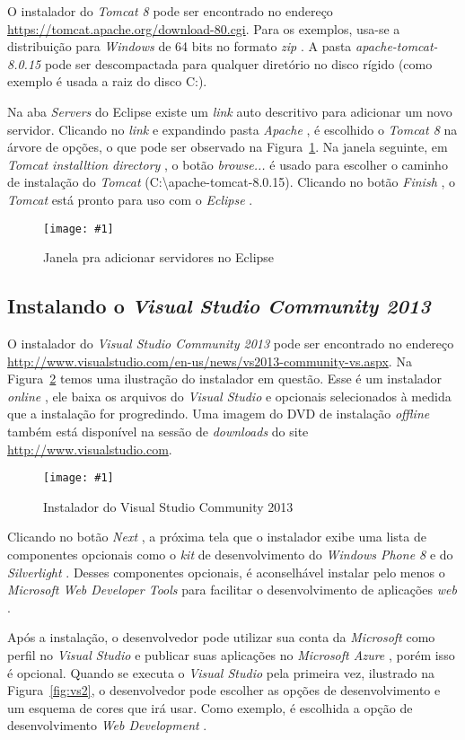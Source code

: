 \documentclass[a4paper,12pt]{article}
\newcommand{\figura}[3] {
	\begin{figure}[ht]
		\centering
		\texttt{[image: \#1]}
		\caption{#2}
		\label{#3}
	\end{figure}
	\FloatBarrier
}
\newcommand{\est}[1] {
	\textit{#1}
}
\begin{document}
O instalador do \est{Tomcat 8} pode ser encontrado no endereço \url{https://tomcat.apache.org/download-80.cgi}. Para os exemplos, usa-se a distribuição para \est{Windows} de 64 bits no formato \est{zip}. A pasta \est{apache-tomcat-8.0.15} pode ser descompactada para qualquer diretório no disco rígido (como exemplo é usada a raiz do disco C:).  

Na aba \est{Servers} do Eclipse existe um \est{link} auto descritivo para adicionar um novo servidor. Clicando no \est{link} e expandindo pasta \est{Apache}, é escolhido o \est{Tomcat 8} na árvore de opções, o que pode ser observado na Figura~\ref{fig:tomcat1}. Na janela seguinte, em \est{Tomcat installtion directory}, o botão \est{browse...} é usado para escolher o caminho de instalação do \est{Tomcat} (C:\textbackslash apache-tomcat-\textmd{8.0.15}). Clicando no botão \est{Finish}, o \est{Tomcat} está pronto para uso com o \est{Eclipse}. 

\figura{tomcat1.png}{Janela pra adicionar servidores no Eclipse}{fig:tomcat1}

\subsection{Instalando o \est{Visual Studio Community 2013}} 

O instalador do \est{Visual Studio Community 2013} pode ser encontrado no endereço \url{http://www.visualstudio.com/en-us/news/vs2013-community-vs.aspx}. Na Figura~\ref{fig:vs1} temos uma ilustração do instalador em questão. Esse é um instalador \est{online}, ele baixa os arquivos do \est{Visual Studio} e opcionais selecionados à medida que a instalação for progredindo. Uma imagem do DVD de instalação \est{offline} também está disponível na sessão de \est{downloads} do site \url{http://www.visualstudio.com}.

\figura{vs1.png}{Instalador do Visual Studio Community 2013}{fig:vs1}

Clicando no botão \est{Next}, a próxima tela que o instalador exibe uma lista de componentes opcionais como o \est{kit} de desenvolvimento do \est{Windows Phone 8} e do \est{Silverlight}. Desses componentes opcionais, é aconselhável instalar pelo menos o \est{Microsoft Web Developer Tools} para facilitar o desenvolvimento de aplicações \est{web}.

Após a instalação, o desenvolvedor pode utilizar sua conta da \est{Microsoft} como perfil no \est{Visual Studio} e publicar suas aplicações no \est{Microsoft Azure}, porém isso é opcional. Quando se executa o \est{Visual Studio} pela primeira vez, ilustrado na Figura~\ref{fig:vs2}, o desenvolvedor pode escolher as opções de desenvolvimento e um esquema de cores que irá usar. Como exemplo, é escolhida a opção de desenvolvimento \est{Web Development}.
\end{document}
